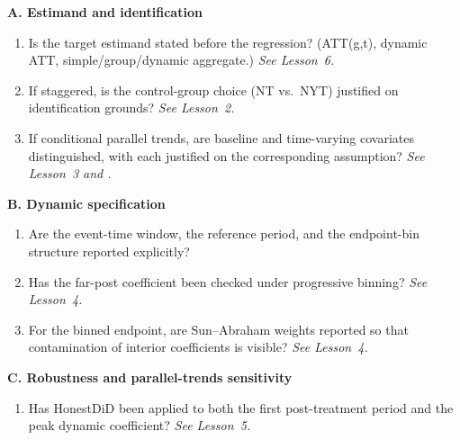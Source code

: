 \begin{tcolorbox}[
  colback=gray!5,
  colframe=black!70,
  arc=1mm,
  boxrule=0.5pt,
  left=3pt,right=3pt,top=6pt,bottom=6pt,
  title={\textbf{Box 4.1. Pre-Submission DiD Checklist}},
  fonttitle=\small\bfseries,
  coltitle=black,
  colbacktitle=gray!15
]
\footnotesize

\textbf{A. Estimand and identification}

\vspace{0.3em}
\begin{enumerate}[leftmargin=1.6em,itemsep=0.25em,label=\arabic*.]
\item Is the target estimand stated before the regression? (ATT(g,t), dynamic ATT, simple/group/dynamic aggregate.) \textit{See Lesson~6.}

\item If staggered, is the control-group choice (NT vs.\ NYT) justified on identification grounds? \textit{See Lesson~2.}

\item If conditional parallel trends, are baseline and time-varying covariates distinguished, with each justified on the corresponding assumption? \textit{See Lesson~3 and \textcite{caetano2022difference}.}
\end{enumerate}

\textbf{B. Dynamic specification}

\vspace{0.3em}
\begin{enumerate}[leftmargin=1.6em,itemsep=0.25em,label=\arabic*.,start=4]
\item Are the event-time window, the reference period, and the endpoint-bin structure reported explicitly?

\item Has the far-post coefficient been checked under progressive binning? \textit{See Lesson~4.}

\item For the binned endpoint, are Sun--Abraham weights reported so that contamination of interior coefficients is visible? \textit{See Lesson~4.}
\end{enumerate}

\textbf{C. Robustness and parallel-trends sensitivity}

\vspace{0.3em}
\begin{enumerate}[leftmargin=1.6em,itemsep=0.25em,label=\arabic*.,start=7]
\item Has HonestDiD been applied to both the first post-treatment period and the peak dynamic coefficient? \textit{See Lesson~5.}


\end{enumerate}
\end{tcolorbox}
